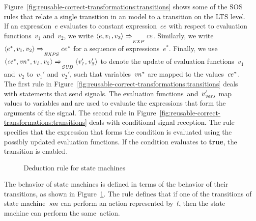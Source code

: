 Figure~\ref{fig:reusable-correct-transformations:transitions} shows some of the SOS rules that relate a single transition in an \SLCO model to a transition on the LTS level.
If an expression~$e$ evaluates to constant expression~$ce$ with respect to evaluation functions~$v_1$ and~$v_2$, we write $\langle e, v_1, v_2 \rangle \xRightarrow{\it{}}_{\it{EXP}} ce$.
Similarly, we write $\langle e^*, v_1, v_2 \rangle \xRightarrow{\it{}}_{\it{EXPS}} ce^*$ for a sequence of expressions~$e^*$.
Finally, we use~$\langle \it{ce^*}, \it{vn^*}, v_1, v_2 \rangle \xRightarrow{\it{}}_{\it{SUB}} \langle v_1', v_2' \rangle$ to denote the update of evaluation functions~$v_1$ and~$v_2$ to~$v_1'$ and~$v_2'$, such that variables~$\it{vn^*}$ are mapped to the values~$\it{ce^*}$.
The first rule in Figure~\ref{fig:reusable-correct-transformations:transitions} deals with statements that send signals.
The evaluation functions~\vvars and~$v_{\it{vars}}'$ map values to variables and are used to evaluate the expressions that form the arguments of the signal.
The second rule in Figure~\ref{fig:reusable-correct-transformations:transitions} deals with conditional signal reception.
The rule specifies that the expression that forms the condition is evaluated using the possibly updated evaluation functions.
If the condition evaluates to {\bf true}, the transition is enabled.

\begin{figure}[hbt]
\centering
{}
\caption{Deduction rule for state machines}
\label{fig:reusable-correct-transformations:statemachine}
\end{figure}

The behavior of state machines is defined in terms of the behavior of their transitions, as shown in Figure~\ref{fig:reusable-correct-transformations:statemachine}.
The rule defines that if one of the transitions of state machine~$\it{sm}$ can perform an action represented by~$l$, then the state machine can perform the same~action.

